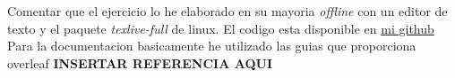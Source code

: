 Comentar que el ejercicio lo he elaborado en su mayoria \textit{offline} con un editor de texto y el paquete \textit{texlive-full} de linux. El codigo esta disponible en \href{https://github.com/dlgeraghty/basix-latex/tree/master/independencia/template}{mi github} \\

Para la documentacion basicamente he utilizado las guias que proporciona overleaf \textbf{INSERTAR REFERENCIA AQUI}
